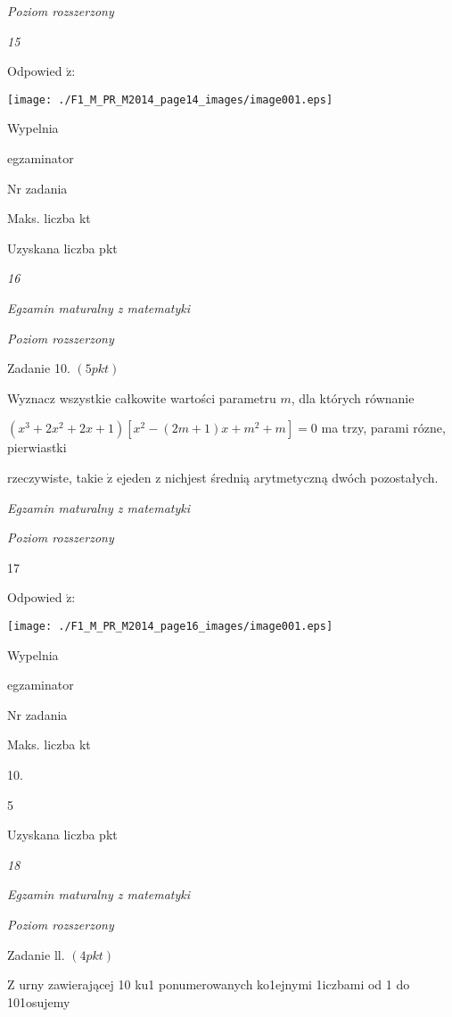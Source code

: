 \documentclass[a4paper,12pt]{article}
\begin{document}
{\it Poziom rozszerzony}

{\it 15}

Odpowied $\acute{\mathrm{z}}$:
\begin{center}
\texttt{[image: ./F1\_M\_PR\_M2014\_page14\_images/image001.eps]}
\end{center}
Wypelnia

egzaminator

Nr zadania

Maks. liczba kt

Uzyskana liczba pkt





{\it 16}

{\it Egzamin maturalny z matematyki}

{\it Poziom rozszerzony}

Zadanie 10. $(5pkt)$

Wyznacz wszystkie całkowite wartości parametru $m$, dla których równanie

$(x^{3}+2x^{2}+2x+1)[x^{2}-(2m+1)x+m^{2}+m]=0$ ma trzy, parami rózne, pierwiastki

rzeczywiste, takie $\dot{\mathrm{z}}$ ejeden z nichjest średnią arytmetyczną dwóch pozostałych.





{\it Egzamin maturalny z matematyki}

{\it Poziom rozszerzony}

17

Odpowied $\acute{\mathrm{z}}$:
\begin{center}
\texttt{[image: ./F1\_M\_PR\_M2014\_page16\_images/image001.eps]}
\end{center}
Wypelnia

egzaminator

Nr zadania

Maks. liczba kt

10.

5

Uzyskana liczba pkt





{\it 18}

{\it Egzamin maturalny z matematyki}

{\it Poziom rozszerzony}

Zadanie ll. $(4pkt)$

$\mathrm{Z}$ urny zawierającej 10 ku1 ponumerowanych ko1ejnymi 1iczbami od 1 do 101osujemy
\end{document}
